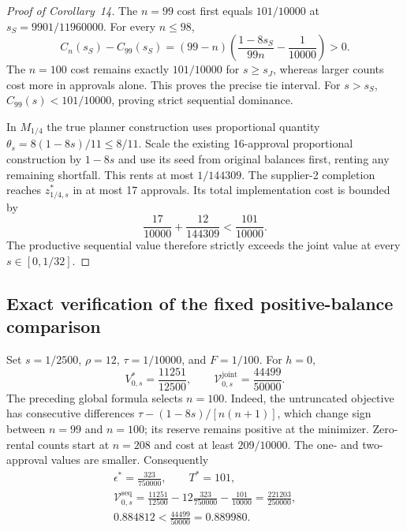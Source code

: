 \documentclass[ecta,draft,supplement]{econsocart}
\theoremstyle{definition}
\theoremstyle{definition}
\begin{document}
\begin{appendix}
\begin{proof}[Proof of Corollary~14%
]
The $n=99$ cost first equals $101/10000$ at
$s_S=9901/11960000$. For every $n\leq98$,
\[
 C_n(s_S)-C_{99}(s_S)
 =(99-n)\left(\frac{1-8s_S}{99n}-\frac1{10000}\right)>0.
\]
The $n=100$ cost remains exactly $101/10000$ for
$s\geq s_J$, whereas larger counts cost more in approvals
alone. This proves the precise tie interval. For $s>s_S$,
$C_{99}(s)<101/10000$, proving strict sequential dominance.

In $M_{1/4}$ the true planner construction uses proportional
quantity $\theta_s=8(1-8s)/11\leq8/11$. Scale the existing
16-approval proportional construction by $1-8s$ and use its
seed from original balances first, renting any remaining
shortfall. This rents at most $1/144309$. The supplier-2
completion reaches $z_{1/4,s}^*$ in at most 17 approvals.
Its total implementation cost is bounded by
\[
 \frac{17}{10000}+\frac{12}{144309}
 <\frac{101}{10000}.
\]
The productive sequential value therefore strictly exceeds
the joint value at every $s\in[0,1/32]$.
\end{proof}


\subsection{Exact verification of the fixed positive-balance comparison}

Set $s=1/2500$, $\rho=12$, $\tau=1/10000$, and $F=1/100$.
For $h=0$,
\[
 V_{0,s}^*=\frac{11251}{12500},\qquad
 \mathcal V_{0,s}^{\mathrm{joint}}=\frac{44499}{50000}.
\]
The preceding global formula selects $n=100$. Indeed, the untruncated
objective has consecutive differences
$\tau-(1-8s)/[n(n+1)]$, which change sign between $n=99$ and $n=100$;
its reserve remains positive at the minimizer. Zero-rental counts start
at $n=208$ and cost at least $209/10000$. The one- and two-approval
values are smaller. Consequently
\[
 \begin{gathered}
 \epsilon^* = \frac{323}{750000},\qquad T^*=101,\\
 \mathcal V_{0,s}^{\mathrm{seq}}
 =\frac{11251}{12500}-12\frac{323}{750000}-\frac{101}{10000}
 =\frac{221203}{250000},\\
 0.884812<\frac{44499}{50000}=0.889980.
 \end{gathered}
\]


\end{appendix}
\end{document}
